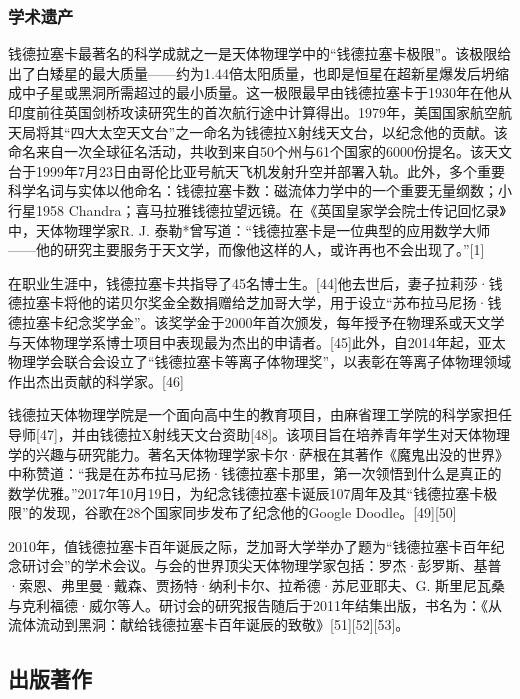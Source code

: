 \subsubsection{学术遗产}
钱德拉塞卡最著名的科学成就之一是天体物理学中的“钱德拉塞卡极限”。该极限给出了白矮星的最大质量——约为1.44倍太阳质量，也即是恒星在超新星爆发后坍缩成中子星或黑洞所需超过的最小质量。这一极限最早由钱德拉塞卡于1930年在他从印度前往英国剑桥攻读研究生的首次航行途中计算得出。1979年，美国国家航空航天局将其“四大太空天文台”之一命名为钱德拉X射线天文台，以纪念他的贡献。该命名来自一次全球征名活动，共收到来自50个州与61个国家的6000份提名。该天文台于1999年7月23日由哥伦比亚号航天飞机发射升空并部署入轨。此外，多个重要科学名词与实体以他命名：钱德拉塞卡数：磁流体力学中的一个重要无量纲数；小行星1958 Chandra；喜马拉雅钱德拉望远镜。在《英国皇家学会院士传记回忆录》中，天体物理学家R. J. 泰勒*曾写道：“钱德拉塞卡是一位典型的应用数学大师——他的研究主要服务于天文学，而像他这样的人，或许再也不会出现了。”[1]

在职业生涯中，钱德拉塞卡共指导了45名博士生。[44]他去世后，妻子拉莉莎·钱德拉塞卡将他的诺贝尔奖金全数捐赠给芝加哥大学，用于设立“苏布拉马尼扬·钱德拉塞卡纪念奖学金”。该奖学金于2000年首次颁发，每年授予在物理系或天文学与天体物理学系博士项目中表现最为杰出的申请者。[45]此外，自2014年起，亚太物理学会联合会设立了“钱德拉塞卡等离子体物理奖”，以表彰在等离子体物理领域作出杰出贡献的科学家。[46]

钱德拉天体物理学院是一个面向高中生的教育项目，由麻省理工学院的科学家担任导师[47]，并由钱德拉X射线天文台资助[48]。该项目旨在培养青年学生对天体物理学的兴趣与研究能力。著名天体物理学家卡尔·萨根在其著作《魔鬼出没的世界》中称赞道：“我是在苏布拉马尼扬·钱德拉塞卡那里，第一次领悟到什么是真正的数学优雅。”2017年10月19日，为纪念钱德拉塞卡诞辰107周年及其“钱德拉塞卡极限”的发现，谷歌在28个国家同步发布了纪念他的Google Doodle。[49][50]

2010年，值钱德拉塞卡百年诞辰之际，芝加哥大学举办了题为“钱德拉塞卡百年纪念研讨会”的学术会议。与会的世界顶尖天体物理学家包括：罗杰·彭罗斯、基普·索恩、弗里曼·戴森、贾扬特·纳利卡尔、拉希德·苏尼亚耶夫、G. 斯里尼瓦桑与克利福德·威尔等人。研讨会的研究报告随后于2011年结集出版，书名为：《从流体流动到黑洞：献给钱德拉塞卡百年诞辰的致敬》[51][52][53]。
\subsection{出版著作}
